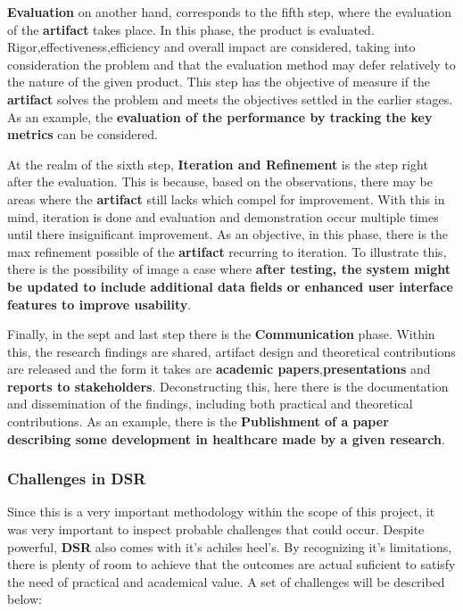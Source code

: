  \textbf{Evaluation} on another hand, corresponds to the fifth step, where the evaluation of the \textbf{artifact} takes place. In this phase, the product is evaluated. Rigor,effectiveness,efficiency and overall impact are considered, taking into consideration the problem and that the evaluation method may defer relatively to the nature of the given product. This step has the objective of measure if the \textbf{artifact} solves the problem and meets the objectives settled in the earlier stages. As an example, the \textbf{evaluation of the performance by tracking the key metrics} can be considered.

 At the realm of the sixth step, \textbf{Iteration and Refinement} is the step right after the evaluation. This is because, based on the observations, there may be areas where the \textbf{artifact} still lacks which compel for improvement. With this in mind, iteration is done and evaluation and demonstration occur multiple times until there insignificant improvement. As an objective, in this phase, there is the max refinement possible of the \textbf{artifact} recurring to iteration. To illustrate this, there is the possibility of image a case where \textbf{after testing, the system might be updated to include additional data fields or enhanced user interface features to improve usability}.

 Finally, in the sept and last step there is the \textbf{Communication} phase. Within this, the research findings are shared, artifact design and theoretical contributions are released and the form it takes are \textbf{academic papers},\textbf{presentations} and \textbf{reports to stakeholders}. Deconstructing this, here there is the documentation and dissemination of the findings, including both practical and theoretical contributions. As an example, there is the \textbf{Publishment of a paper describing some development in healthcare made by a given research}.

\subsubsection{Challenges in DSR}
Since this is a very important methodology within the scope of this project, it was very important to inspect probable challenges that could occur.
Despite powerful, \textbf{DSR} also comes with it's achiles heel's. By recognizing it's limitations, there is plenty of room to achieve that the outcomes are actual suficient to satisfy the need of practical and academical value. A set of challenges will be described below:
